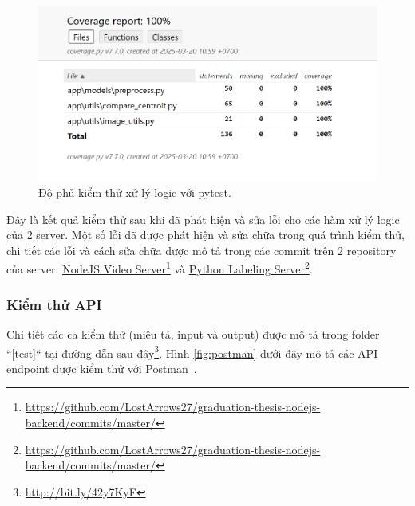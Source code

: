 
\begin{figure}[H]
    \centering  
    \includegraphics[width=1\textwidth]{figures/c4/4-3/pytest_2.png}
    \caption{Độ phủ kiểm thử xử lý logic với pytest.}
    \label{fig:pytest-testing}
\end{figure}

Đây là kết quả kiểm thử sau khi đã phát hiện và sửa lỗi cho các hàm xử lý logic của 2 server. Một số lỗi đã được phát hiện và sửa chữa trong quá trình kiểm thử, chi tiết các lỗi và cách sửa chữa được mô tả trong các commit trên 2 repository của server: \href{https://github.com/LostArrows27/graduation-thesis-nodejs-backend/commits/master/}{NodeJS Video Server}\footnote{\url{https://github.com/LostArrows27/graduation-thesis-nodejs-backend/commits/master/}} và \href{https://github.com/LostArrows27/graduation-thesis-python-backend/commits/master/}{Python Labeling Server}\footnote{\url{https://github.com/LostArrows27/graduation-thesis-nodejs-backend/commits/master/}}.


\subsubsection{Kiểm thử API}

Chi tiết các ca kiểm thử (miêu tả, input và output) được mô tả trong folder ``[test]`` tại đường dẫn sau đây\footnote{\url{http://bit.ly/42y7KyF}}. Hình \ref{fig:postman} dưới đây mô tả các API endpoint được kiểm thử với Postman~\cite{postman}.  

